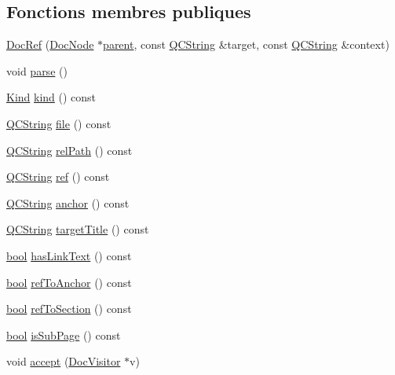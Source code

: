 \subsection*{Fonctions membres publiques}
\begin{DoxyCompactItemize}
\item 
\hyperlink{class_doc_ref_abd26eba958639f0810bcc5bd4a0c9dc5}{Doc\+Ref} (\hyperlink{class_doc_node}{Doc\+Node} $\ast$\hyperlink{class_doc_node_a990d8b983962776a647e6231d38bd329}{parent}, const \hyperlink{class_q_c_string}{Q\+C\+String} \&target, const \hyperlink{class_q_c_string}{Q\+C\+String} \&context)
\item 
void \hyperlink{class_doc_ref_a6004b78783411b8c5752371572afa3ef}{parse} ()
\item 
\hyperlink{class_doc_node_aebd16e89ca590d84cbd40543ea5faadb}{Kind} \hyperlink{class_doc_ref_adc5f2538aaa8e2bb57ddabd1417bff60}{kind} () const 
\item 
\hyperlink{class_q_c_string}{Q\+C\+String} \hyperlink{class_doc_ref_a33ee87acaab706ebb0fe1490438979b9}{file} () const 
\item 
\hyperlink{class_q_c_string}{Q\+C\+String} \hyperlink{class_doc_ref_a5a2d384a3c27a8e24cfab5b1ed099aba}{rel\+Path} () const 
\item 
\hyperlink{class_q_c_string}{Q\+C\+String} \hyperlink{class_doc_ref_acec19cf25d3338063b21dce828a7d7c5}{ref} () const 
\item 
\hyperlink{class_q_c_string}{Q\+C\+String} \hyperlink{class_doc_ref_a075bf0046d5ad92199a748b75962d464}{anchor} () const 
\item 
\hyperlink{class_q_c_string}{Q\+C\+String} \hyperlink{class_doc_ref_a95d8db09f8ccb20150176439050225f0}{target\+Title} () const 
\item 
\hyperlink{qglobal_8h_a1062901a7428fdd9c7f180f5e01ea056}{bool} \hyperlink{class_doc_ref_a51382109fe805daf64005bc9f48642a5}{has\+Link\+Text} () const 
\item 
\hyperlink{qglobal_8h_a1062901a7428fdd9c7f180f5e01ea056}{bool} \hyperlink{class_doc_ref_ad3b557b70e0296dca6e16778dabe170f}{ref\+To\+Anchor} () const 
\item 
\hyperlink{qglobal_8h_a1062901a7428fdd9c7f180f5e01ea056}{bool} \hyperlink{class_doc_ref_a91f7f964c7bb0a61be6bf6b1e3b08bb6}{ref\+To\+Section} () const 
\item 
\hyperlink{qglobal_8h_a1062901a7428fdd9c7f180f5e01ea056}{bool} \hyperlink{class_doc_ref_a975967cb6e23c632d63e3b10f91c0cda}{is\+Sub\+Page} () const 
\item 
void \hyperlink{class_doc_ref_a25a0bbf3186201c53d4a2f08448e4a0e}{accept} (\hyperlink{class_doc_visitor}{Doc\+Visitor} $\ast$v)
\end{DoxyCompactItemize}
